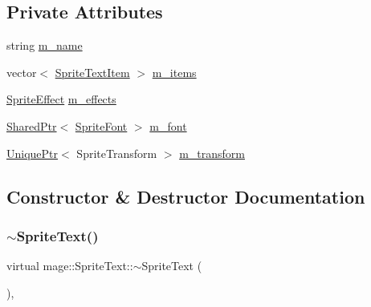 \subsection*{Private Attributes}
\begin{DoxyCompactItemize}
\item 
string \hyperlink{classmage_1_1_sprite_text_a2c4cde370b6785d970c2d3ef127dda87}{m\+\_\+name}
\item 
vector$<$ \hyperlink{structmage_1_1_sprite_text_item}{Sprite\+Text\+Item} $>$ \hyperlink{classmage_1_1_sprite_text_a5990cef53a24dcd6d6bf0ff550145ca4}{m\+\_\+items}
\item 
\hyperlink{namespacemage_a9cfe18123066ba4236f548f9de75d881}{Sprite\+Effect} \hyperlink{classmage_1_1_sprite_text_a5fdeb8c2f30482e2c89d892aeb43c50b}{m\+\_\+effects}
\item 
\hyperlink{namespacemage_a1e01ae66713838a7a67d30e44c67703e}{Shared\+Ptr}$<$ \hyperlink{classmage_1_1_sprite_font}{Sprite\+Font} $>$ \hyperlink{classmage_1_1_sprite_text_a922e37fbcbc431e815ebabe82e4528b0}{m\+\_\+font}
\item 
\hyperlink{namespacemage_a8c307fbcc33bce9b7f2aa4c26c3b95cf}{Unique\+Ptr}$<$ Sprite\+Transform $>$ \hyperlink{classmage_1_1_sprite_text_a2b8441454a3811e6a1869d999c4d2063}{m\+\_\+transform}
\end{DoxyCompactItemize}


\subsection{Constructor \& Destructor Documentation}
\hypertarget{classmage_1_1_sprite_text_a0a231f260bb855b7be3280aa74a3e5c6}{}\label{classmage_1_1_sprite_text_a0a231f260bb855b7be3280aa74a3e5c6} 
\subsubsection{\texorpdfstring{$\sim$\+Sprite\+Text()}{~SpriteText()}}
{\footnotesize\ttfamily virtual mage\+::\+Sprite\+Text\+::$\sim$\+Sprite\+Text (\begin{DoxyParamCaption}{ }\end{DoxyParamCaption})\hspace{0.3cm}{\ttfamily [virtual]}, {\ttfamily [default]}}

\hypertarget{classmage_1_1_sprite_text_a929b24bba456bfd37a9ebf04db88d4c5}{}\label{classmage_1_1_sprite_text_a929b24bba456bfd37a9ebf04db88d4c5} 
